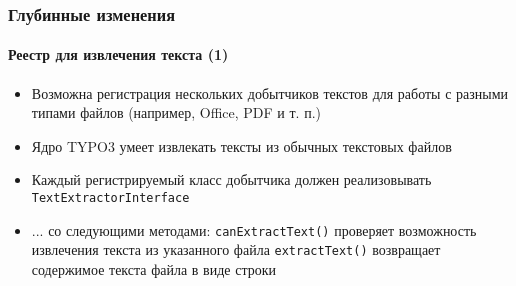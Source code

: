 \begin{frame}[fragile]
	\frametitle{Глубинные изменения}
	\framesubtitle{Реестр для извлечения текста (1)}

	\lstset{basicstyle=\tiny\ttfamily}

	\begin{itemize}

		\item Возможна регистрация нескольких добытчиков текстов для работы с разными типами
			файлов (например, Office, PDF и т. п.)

		\item Ядро TYPO3 умеет извлекать тексты из обычных текстовых файлов

		\item Каждый регистрируемый класс добытчика должен реализовывать \texttt{TextExtractorInterface}

		\item ... со следующими методами:\newline
			\texttt{canExtractText()}\newline
			\small
				проверяет возможность извлечения текста из указанного файла
			\normalsize
			\newline
			\texttt{extractText()}\newline
			\small
				возвращает содержимое текста файла в виде строки
			\normalsize

	\end{itemize}

\end{frame}


